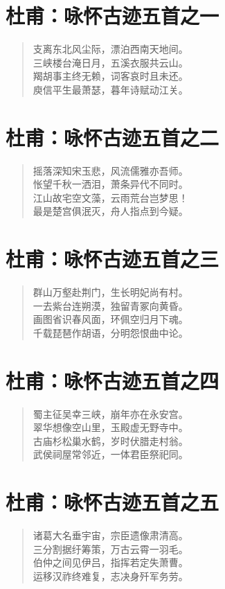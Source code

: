 \documentclass[12pt,oneside]{book}
\newenvironment{shici}{
\begin{verse}
\centering\large\hspace{12pt}}
{\end{verse}}
\begin{document}
\chapter{杜甫：咏怀古迹五首之一}
\begin{shici}
支离东北风尘际，漂泊西南天地间。\\
三峡楼台淹日月，五溪衣服共云山。\\
羯胡事主终无赖，词客哀时且未还。\\
庾信平生最萧瑟，暮年诗赋动江关。
\end{shici}

\chapter{杜甫：咏怀古迹五首之二}
\begin{shici}
摇落深知宋玉悲，风流儒雅亦吾师。\\
怅望千秋一洒泪，萧条异代不同时。\\
江山故宅空文藻，云雨荒台岂梦思！\\
最是楚宫俱泯灭，舟人指点到今疑。
\end{shici}

\chapter{杜甫：咏怀古迹五首之三}
\begin{shici}
群山万壑赴荆门，生长明妃尚有村。\\
一去紫台连朔漠，独留青冢向黄昏。\\
画图省识春风面，环佩空归月下魂。\\
千载琵琶作胡语，分明怨恨曲中论。
\end{shici}

\chapter{杜甫：咏怀古迹五首之四}
\begin{shici}
蜀主征吴幸三峡，崩年亦在永安宫。\\
翠华想像空山里，玉殿虚无野寺中。\\
古庙杉松巢水鹤，岁时伏腊走村翁。\\
武侯祠屋常邻近，一体君臣祭祀同。
\end{shici}

\chapter{杜甫：咏怀古迹五首之五}
\begin{shici}
诸葛大名垂宇宙，宗臣遗像肃清高。\\
三分割据纡筹策，万古云霄一羽毛。\\
伯仲之间见伊吕，指挥若定失萧曹。\\
运移汉祚终难复，志决身歼军务劳。
\end{shici}
\end{document}
